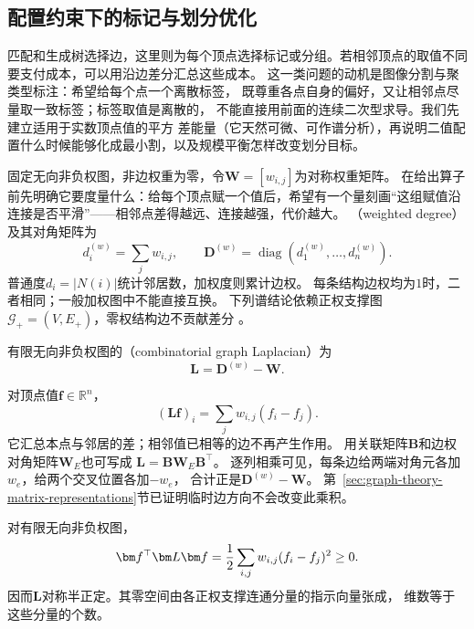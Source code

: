 \subsection{配置约束下的标记与划分优化}
\label{sec:graph-theory-spectrum-discrete-symmetry}
\label{sec:graph-theory-vertex-configuration}

匹配和生成树选择边，这里则为每个顶点选择标记或分组。若相邻顶点的取值不同
要支付成本，可以用沿边差分汇总这些成本。
这一类问题的动机是图像分割与聚类型标注：希望给每个点一个离散标签，
既尊重各点自身的偏好，又让相邻点尽量取一致标签；标签取值是离散的，
不能直接用前面的连续二次型求导。我们先建立适用于实数顶点值的平方
差能量（它天然可微、可作谱分析），再说明二值配置什么时候能够化成最小割，以及规模平衡怎样改变划分目标。

固定无向非负权图，非边权重为零，令\(\bm W=[w_{i,j}]\)为对称权重矩阵。
在给出算子前先明确它要度量什么：给每个顶点赋一个值后，希望有一个量刻画“这组赋值沿连接是否平滑”——相邻点差得越远、连接越强，代价越大。
（weighted degree）及其对角矩阵为
\[
  d_i^{(w)}=\sum_jw_{i,j},\qquad
  \bm D^{(w)}=\operatorname{diag}(d_1^{(w)},\ldots,d_n^{(w)}).
\]
普通度\(d_i=|N(i)|\)统计邻居数，加权度则累计边权。
每条结构边权均为\(1\)时，二者相同；一般加权图中不能直接互换。
下列谱结论依赖正权支撑图\(\mathcal G_+=(V,E_+)\)，零权结构边不贡献差分
。

\begin{definition}[组合图拉普拉斯]
  \label{def:graph-theory-combinatorial-laplacian}
  有限无向非负权图的（combinatorial graph Laplacian）为
  \begin{equation}
    \bm L=\bm D^{(w)}-\bm W.
    \label{eq:graph-theory-combinatorial-laplacian}
  \end{equation}
\end{definition}

对顶点值\(\bm f\in\mathbb R^n\)，
\[
  (\bm L\bm f)_i=\sum_jw_{i,j}(f_i-f_j).
\]
它汇总本点与邻居的差；相邻值已相等的边不再产生作用。
用关联矩阵\(\bm B\)和边权对角矩阵\(\bm W_E\)也可写成
\(\bm L=\bm B\bm W_E\bm B^\top\)。
逐列相乘可见，每条边给两端对角元各加\(w_e\)，给两个交叉位置各加\(-w_e\)，
合计正是\(\bm D^{(w)}-\bm W\)。
第~\ref{sec:graph-theory-matrix-representations}节已证明临时边方向不会改变此乘积。

\begin{theorem}[图拉普拉斯的Dirichlet能量与零空间]
  \label{thm:graph-theory-laplacian-energy-nullspace}
  对有限无向非负权图，
  \begingroup
  \let\graphenergylabel\label
  \begin{equation}
    \let\label\graphenergylabel
    \bm f^\top\bm L\bm f
    =\frac12\sum_{i,j}w_{i,j}(f_i-f_j)^2\geq0.
    \label{eq:graph-theory-dirichlet-energy}
    \label{eq:signal-analysis-graph-dirichlet-energy}
  \end{equation}
  \endgroup
  因而\(\bm L\)对称半正定。其零空间由各正权支撑连通分量的指示向量张成，
  维数等于这些分量的个数。
\end{theorem}

